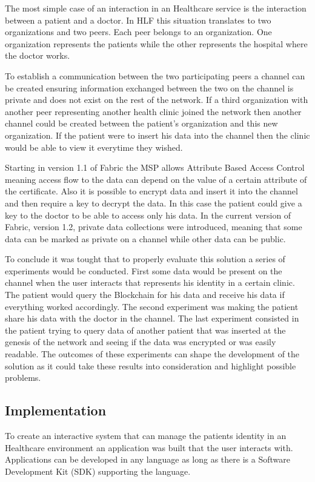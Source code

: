 The most simple case of an interaction in an Healthcare service is the
interaction between a patient and a doctor. In HLF this situation translates to
two organizations and two peers. Each peer belongs to an organization. One
organization represents the patients while the other represents the hospital
where the doctor works. 

To establish a communication between the two participating peers a channel can
be created ensuring information exchanged between the two on the channel is
private and does not exist on the rest of the network.  If a third organization
with another peer representing another health clinic joined the network then
another channel could be created between the patient's organization and this
new organization. If the patient were to insert his data into the channel then
the clinic would be able to view it everytime they wished. 

Starting in version 1.1 of Fabric the MSP allows Attribute Based Access Control
meaning access flow to the data can depend on the value of a certain attribute
of the certificate. Also it is possible to encrypt data and insert it into the
channel and then require a key to decrypt the data. In this case the patient
could give a key to the doctor to be able to access only his data. In the
current version of Fabric, version 1.2, private data collections were
introduced, meaning that some data can be marked as private on a channel while
other data can be public.

To conclude it was tought that to properly evaluate this solution a series of
experiments would be conducted. First some data would be present on the channel
when the user interacts that represents his identity in a certain clinic. The
patient would query the Blockchain for his data and receive his data if
everything worked accordingly. The second experiment was making the patient
share his data with the doctor in the channel. The last experiment consisted in
the patient trying to query data of another patient that was inserted at the
genesis of the network and seeing if the data was encrypted or was easily
readable. The outcomes of these experiments can shape the development of the
solution as it could take these results into consideration and highlight
possible problems.


\subsection{Implementation}

To create an interactive system that can manage the patients identity in an
Healthcare environment an application was built that the user interacts with.
Applications can be developed in any language as long as there is a Software
Development Kit (SDK) supporting the language. 

